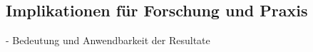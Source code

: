\subsection{Implikationen für Forschung und Praxis} \label{sec:Implikationen für Forschung und Praxis}

- Bedeutung und Anwendbarkeit der Resultate